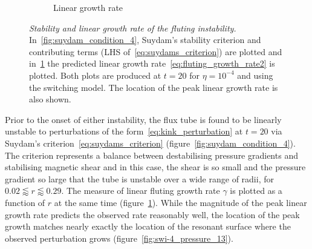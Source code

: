\documentclass[12pt]{article}
\newcommand{\mycaption}[2]{\caption[#1]{\emph{#1} #2}}
\begin{document}
\begin{figure}[t]
\begin{subfigure}{0.49\textwidth}
      \caption{Linear growth rate}
      \label{fig:growth_rate_4}
    \end{subfigure}
\mycaption{Stability and linear growth rate of the fluting instability.}{In~\ref{fig:suydam_condition_4}, Suydam's stability criterion and contributing terms (LHS of~\eqref{eq:suydams_criterion})  are plotted and in~\ref{fig:growth_rate_4} the predicted linear growth rate~\eqref{eq:fluting_growth_rate2} is plotted. Both plots are produced at $t=20$ for $\eta=10^{-4}$ and using the switching model. The location of the peak linear growth rate is also shown.}
\label{fig:stability_and_growth}%
\end{figure}

Prior to the onset of either instability, the flux tube is found to be linearly unstable to perturbations of the form~\eqref{eq:kink_perturbation} at $t=20$ via Suydam's criterion~\eqref{eq:suydams_criterion} (figure~\ref{fig:suydam_condition_4}). The criterion represents a balance between destabilising pressure gradients and stabilising magnetic shear and in this case, the shear is so small and the pressure gradient so large that the tube is unstable over a wide range of radii, for $ 0.02 \lessapprox r \lessapprox 0.29$. The measure of linear fluting growth rate $\gamma$ is plotted as a function of $r$ at the same time (figure~\ref{fig:growth_rate_4}). While the magnitude of the peak linear growth rate predicts the observed rate reasonably well, the location of the peak growth matches nearly exactly the location of the resonant surface where the observed perturbation grows (figure~\ref{fig:swi-4_pressure_13}).
\end{document}
